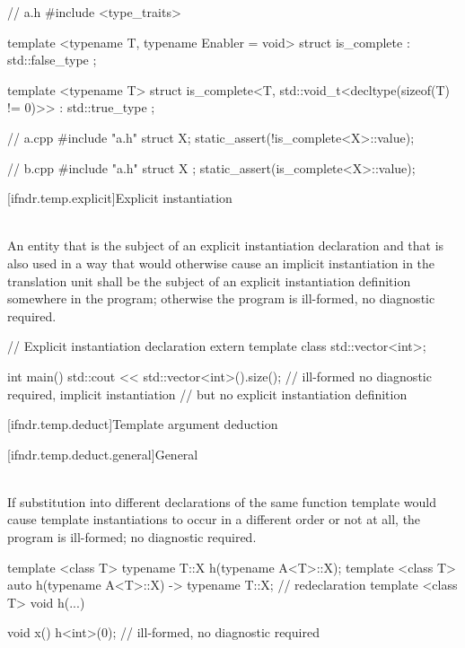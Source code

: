 \pnum
\begin{example}
\begin{codeblock}
// a.h
#include <type_traits>

template <typename T, typename Enabler = void>
struct is_complete : std::false_type {};

template <typename T>
struct is_complete<T, std::void_t<decltype(sizeof(T) != 0)>> : std::true_type {};

// a.cpp
#include "a.h"
struct X;
static_assert(!is_complete<X>::value);

// b.cpp
#include "a.h"
struct X { };
static_assert(is_complete<X>::value);
\end{codeblock}
\end{example}


[ifndr.temp.explicit]{Explicit instantiation}

\pnum
{} \\
An entity that is the subject of
an explicit instantiation declaration and that is also used in a way that would otherwise cause an implicit
instantiation in the translation unit shall be the subject of an explicit instantiation definition
somewhere in the program; otherwise the program is ill-formed, no diagnostic required.

\pnum
\begin{example}
\begin{codeblock}
// Explicit instantiation declaration
extern template class std::vector<int>;

int main() {
  std::cout << std::vector<int>().size();   // ill-formed no diagnostic required, implicit instantiation
                                            // but no explicit instantiation definition
}
\end{codeblock}
\end{example}


[ifndr.temp.deduct]{Template argument deduction}

[ifndr.temp.deduct.general]{General}

\pnum
{} \\
If substitution
into different declarations of the same function template would cause template instantiations to occur in a
different order or not at all, the program is ill-formed; no diagnostic required.

\pnum
\begin{example}
\begin{codeblock}
template <class T> typename T::X h(typename A<T>::X);
template <class T> auto h(typename A<T>::X) -> typename T::X;   // redeclaration
template <class T> void h(...) { }

void x() {
  h<int>(0);    // ill-formed, no diagnostic required
}
\end{codeblock}
\end{example}
